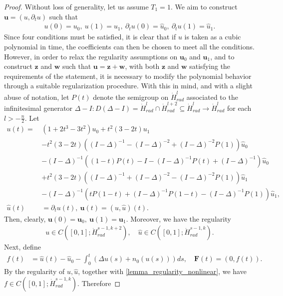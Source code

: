\documentclass[12pt,reqno]{amsart}
\theoremstyle{plain}
\theoremstyle{remark}
\theoremstyle{plain}
\theoremstyle{definition}
\numberwithin{equation}{section}
\numberwithin{equation}{section}
\begin{document}
	\begin{proof}
		Without loss of generality, let us assume $T_1=1$.
		We aim to construct $\mathbf{u}=(u,\partial_t u)$ such that \begin{align*}
			u(0)=u_{0},\ u(1)=u_1,\ \partial_t u(0)=\hat{u}_0,\ \partial_t u(1)=\hat{u}_{1}.
		\end{align*}
		Since four conditions must be satisfied, it is clear that if $u$ is taken as a cubic polynomial in time, the coefficients can then be chosen to meet all the conditions. However, in order to relax the regularity assumptions on $\mathbf{u}_0$ and $\mathbf{u}_1$, and to construct $\mathbf{z}$ and $\mathbf{w}$ such that $\mathbf{u} = \mathbf{z} + \mathbf{w}$, with both $\mathbf{z}$ and $\mathbf{w}$ satisfying the requirements of the statement, it is necessary to modify the polynomial behavior through a suitable regularization procedure. With this in mind, and with a slight abuse of notation, let $P(t)$ denote the semigroup on $\dot{H}^l_{rad}$ associated to the infinitesimal generator $\Delta-I:D(\Delta-I)=\dot{H}^l_{rad}\cap \dot{H}^{l+2}_{rad}\subseteq \dot{H}^l_{rad}\rightarrow \dot{H}^l_{rad}$ for each $l>-\frac{n}{2}$.
		Let 
		\begin{align*}
			u(t)=\, &\left(1+2t^3-3t^2\right)u_0+t^2(3-2t)u_1\\ & -t^2(3-2t)\left((I-\Delta)^{-1}-(I-\Delta)^{-2}+(I-\Delta)^{-2}P(1)\right)\hat{u}_0\\ & -(I-\Delta)^{-1}((1-t)P(t)-I-(I-\Delta)^{-1}P(t)+(I-\Delta)^{-1})\hat{u}_0\\ & +t^2(3-2t)\left((I-\Delta)^{-1}+(I-\Delta)^{-2}-(I-\Delta)^{-2}P(1)\right)\hat{u}_{1}\\\ & -(I-\Delta)^{-1}\left(tP(1-t)+(I-\Delta)^{-1}P(1-t)-(I-\Delta)^{-1}P(1)\right)\hat{u}_{1},\\
			\hat{u}(t)&=\partial_t u(t),\ \mathbf{u}(t)=(u,\hat{u})(t).
		\end{align*}
		Then, clearly, 
		   $ \mathbf{u}(0)=\mathbf{u}_0,\
		\mathbf{u}(1)=\mathbf{u}_1.
		$		Moreover, we have the regularity \begin{align*}
			u\in C([0,1];\dot{H}^{s-1,k+2}_{rad}),\quad \hat{u}\in C([0,1];\dot{H}^{s-1,k}_{rad}).
		\end{align*}
		Next, define \begin{align*}
			f(t)&=\hat{u}(t)-\hat{u}_0-\int_0^t\left(\Delta u(s)+n_0(u(s))\right) ds,\quad \mathbf{F}(t)=\left(0,f(t)\right).
		\end{align*}
		By the regularity of $u, \hat{u}$, together with \autoref{lemma_regularity_nonlinear}, we have $f\in C([0,1];\dot{H}^{s-1,k}_{rad} )$. Therefore

\end{proof}
\end{document}
